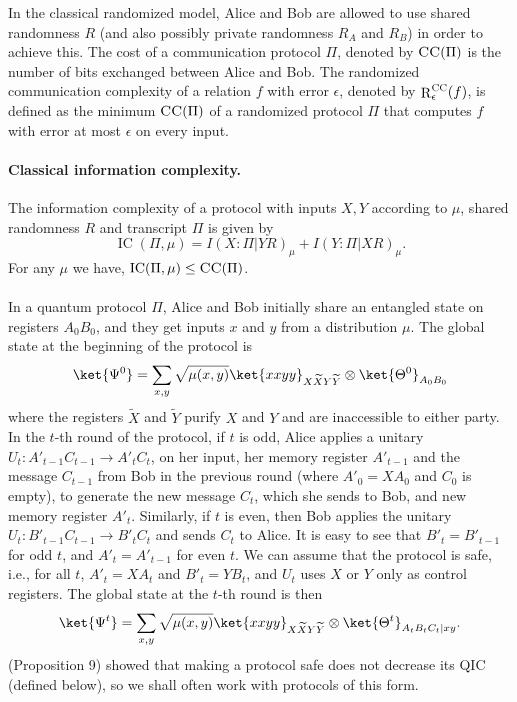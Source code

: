 \documentclass[10pt,a4paper]{article}
\theoremstyle{definition}
\newcommand{\CC}{\textsc{CC}}
\renewcommand{\>}{\rangle}
\newcommand{\<}{\langle}
\newcommand{\tX}{\widetilde{X}}
\newcommand{\tY}{\widetilde{Y}}
\DeclareMathOperator{\R}{R}
\DeclareMathOperator{\IC}{IC}
\begin{document}
In the classical randomized model, Alice and Bob are allowed to use shared randomness $R$ (and also possibly private randomness $R_A$ and $R_B$) in order to achieve this. The cost of a communication protocol $\Pi$, denoted by $\CC(\Pi)$ is the number of bits exchanged between Alice and Bob. The randomized communication complexity of a relation $f$ with error $\epsilon$, denoted by $\R^\CC_\epsilon(f)$, is defined as the minimum $\CC(\Pi)$ of a randomized protocol $\Pi$ that computes $f$ with error at most $\epsilon$ on every input.

\paragraph{Classical information complexity.} The information complexity of a protocol with inputs $X,Y$ according to $\mu$, shared randomness $R$ and transcript $\Pi$ is given by
\[ \IC(\Pi,\mu) = I(X:\Pi|YR)_\mu + I(Y:\Pi|XR)_\mu.\]
For any $\mu$ we have, $\IC(\Pi,\mu) \leq \CC(\Pi)$.

\paragraph{} In a quantum protocol $\Pi$, Alice and Bob initially share an entangled state on registers $A_0B_0$, and they get inputs $x$ and $y$ from a distribution $\mu$. The global state at the beginning of the protocol is
\[ \ket{\Psi^0} = \sum_{x,y}\sqrt{\mu(x,y)}\ket{xxyy}_{X\tX Y\tY}\otimes\ket{\Theta^0}_{A_0B_0}\]
where the registers $\tX$ and $\tY$ purify $X$ and $Y$ and are inaccessible to either party. In the $t$-th round of the protocol, if $t$ is odd, Alice applies a unitary $U_t: A'_{t-1}C_{t-1} \to A'_tC_t$, on her input, her memory register $A'_{t-1}$ and the message $C_{t-1}$ from Bob in the previous round (where $A'_0=XA_0$ and $C_0$ is empty), to generate the new message $C_t$, which she sends to Bob, and new memory register $A'_t$. Similarly, if $t$ is even, then Bob applies the unitary $U_t: B'_{t-1}C_{t-1} \to B'_tC_t$ and sends $C_t$ to Alice. It is easy to see that $B'_t=B'_{t-1}$ for odd $t$, and $A'_t=A'_{t-1}$ for even $t$. We can assume that the protocol is safe, i.e., for all $t$, $A'_t=XA_t$ and $B'_t = YB_t$, and $U_t$ uses $X$ or $Y$ only as control registers. The global state at the $t$-th round is then
\[ \ket{\Psi^t} = \sum_{x,y}\sqrt{\mu(x,y)}\ket{xxyy}_{X\tX Y\tY}\otimes\ket{\Theta^t}_{A_tB_tC_t|xy}.\]
\cite{LT17} (Proposition 9) showed that making a protocol safe does not decrease its QIC (defined below), so we shall often work with protocols of this form.
\end{document}
